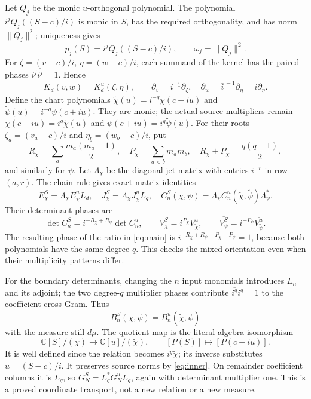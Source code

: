 \documentclass[11pt]{article}
\newcommand{\C}{\mathbb C}
\begin{document}
Let \(Q_j\) be the monic \(u\)-orthogonal polynomial. The polynomial
\(i^jQ_j((S-c)/i)\) is monic in \(S\), has the required
orthogonality, and has norm \(\|Q_j\|^2\); uniqueness gives
\[
 p_j(S)=i^jQ_j((S-c)/i),\qquad \omega_j=\|Q_j\|^2.
\]
For \(\zeta=(v-c)/i\), \(\eta=(w-c)/i\), each summand of the kernel
has the paired phases \(i^j\overline{i^j}=1\). Hence
\[
 K_d(v,\overline w)=K_d^u(\zeta,\overline\eta),\qquad
 \partial_v=i^{-1}\partial_\zeta,\quad
 \partial_{\overline w}=\overline{i}^{\,-1}\partial_{\overline\eta}
                         =i\partial_{\overline\eta}.
\]
Define the chart polynomials
\(\widetilde\chi(u)=i^{-q}\chi(c+iu)\) and
\(\widetilde\psi(u)=i^{-q}\psi(c+iu)\). They are monic; the actual
source multipliers remain
\(\chi(c+iu)=i^q\widetilde\chi(u)\) and
\(\psi(c+iu)=i^q\widetilde\psi(u)\).
For their roots \(\zeta_a=(v_a-c)/i\) and
\(\eta_b=(w_b-c)/i\), put
\[
 R_\chi=\sum_a\frac{m_a(m_a-1)}2,\quad
 P_\chi=\sum_{a<b}m_am_b,\quad
 R_\chi+P_\chi=\frac{q(q-1)}2,
\]
and similarly for \(\psi\). Let \(\Lambda_\chi\) be the diagonal
jet matrix with entries \(i^{-r}\) in row \((a,r)\).
The chain rule gives exact matrix identities
\begin{equation}\label{eq:jetphases}
 E_\chi^S=\Lambda_\chi E_{\widetilde\chi}^{u}L_d,
 \quad J_\chi^S=\Lambda_\chi J_{\widetilde\chi}^{u}L_q,
 \quad C_n^S(\chi,\psi)
       =\Lambda_\chi C_n^u(\widetilde\chi,\widetilde\psi)
                          \Lambda_\psi^*.
\end{equation}
Their determinant phases are
\[
 \det C_n^S=i^{-R_\chi+R_\psi}\det C_n^u,\qquad
 V_\chi^S=i^{P_\chi}V_{\widetilde\chi}^{u},\qquad
 \overline{V_\psi^S}=i^{-P_\psi}\overline{V_{\widetilde\psi}^{u}}.
\]
The resulting phase of the ratio in \eqref{eq:main} is
\(i^{-R_\chi+R_\psi-P_\chi+P_\psi}=1\), because both polynomials
have the same degree \(q\). This checks the mixed orientation even
when their multiplicity patterns differ.

For the boundary determinants, changing the \(n\) input monomials
introduces \(L_n\) and its adjoint; the two degree-\(q\) multiplier
phases contribute \(\overline{i^q}i^q=1\) to the coefficient
cross-Gram. Thus
\[
 B_n^S(\chi,\psi)=B_n^u(\widetilde\chi,\widetilde\psi)
\]
with the measure still \(d\mu\). The quotient map is the literal
algebra isomorphism
\[
 \C[S]/(\chi)\longrightarrow\C[u]/(\widetilde\chi),
 \qquad[P(S)]\longmapsto[P(c+iu)].
\]
It is well defined since the relation becomes
\(i^q\widetilde\chi\); its inverse substitutes \(u=(S-c)/i\).
It preserves source norms by \eqref{eq:inner}. On remainder coefficient
columns it is \(L_q\), so
\(G_N^S=L_q^*G_N^uL_q\), again with determinant multiplier one.
This is a proved coordinate transport, not a new relation or a new
measure.
\end{document}
